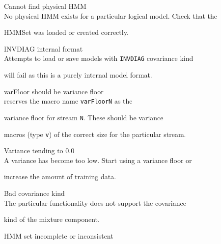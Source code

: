\begin{itemize}





\begin{itemize}


    Cannot find physical HMM\\


        No physical HMM exists for a particular logical model.  Check that the


        HMMSet was loaded or created correctly.





    INVDIAG internal format\\


        Attempts to load or save models with \texttt{INVDIAG} covariance kind


        will fail as this is a purely internal model format.





 varFloor should be variance floor\\


         reserves the macro name \texttt{varFloorN} as the 


        variance floor for stream \texttt{N}.  These should be variance 


        macros (type \texttt{v}) of the correct size for the particular stream.





    Variance tending to 0.0\\


        A variance has become too low.  Start using a variance floor or 


        increase the amount of training data.


        


 Bad covariance kind\\


        The particular functionality does not support the covariance


        kind of the mixture component.





    HMM set incomplete or inconsistent\\



\end{itemize}
\end{itemize}
